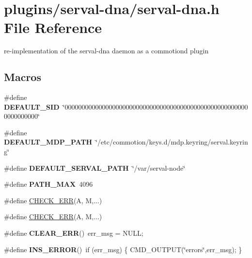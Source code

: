 \hypertarget{serval-dna_8h}{\section{plugins/serval-\/dna/serval-\/dna.h File Reference}
\label{serval-dna_8h}
}


re-\/implementation of the serval-\/dna daemon as a commotiond plugin  


\subsection*{Macros}
\begin{DoxyCompactItemize}
\item 
\hypertarget{serval-dna_8h_ade6bc30b860b7e0c016c9d1d4de78876}{\#define {\bfseries D\+E\+F\+A\+U\+L\+T\+\_\+\+S\+I\+D}~\char`\"{}0000000000000000000000000000000000000000000000000000000000000000\char`\"{}}\label{serval-dna_8h_ade6bc30b860b7e0c016c9d1d4de78876}

\item 
\hypertarget{serval-dna_8h_aa6eb102f7cb9b4ecc447f497f59aefcc}{\#define {\bfseries D\+E\+F\+A\+U\+L\+T\+\_\+\+M\+D\+P\+\_\+\+P\+A\+T\+H}~\char`\"{}/etc/commotion/keys.\+d/mdp.\+keyring/serval.\+keyring\char`\"{}}\label{serval-dna_8h_aa6eb102f7cb9b4ecc447f497f59aefcc}

\item 
\hypertarget{serval-dna_8h_ad6d73c9630ed82f7fe50ef5a025caa52}{\#define {\bfseries D\+E\+F\+A\+U\+L\+T\+\_\+\+S\+E\+R\+V\+A\+L\+\_\+\+P\+A\+T\+H}~\char`\"{}/var/serval-\/node\char`\"{}}\label{serval-dna_8h_ad6d73c9630ed82f7fe50ef5a025caa52}

\item 
\hypertarget{serval-dna_8h_ae688d728e1acdfe5988c7db45d6f0166}{\#define {\bfseries P\+A\+T\+H\+\_\+\+M\+A\+X}~4096}\label{serval-dna_8h_ae688d728e1acdfe5988c7db45d6f0166}

\item 
\#define \hyperlink{serval-dna_8h_a10ab198359509a611627a85d8321ac86}{C\+H\+E\+C\+K\+\_\+\+E\+R\+R}(A, M,...)
\item 
\#define \hyperlink{serval-dna_8h_a10ab198359509a611627a85d8321ac86}{C\+H\+E\+C\+K\+\_\+\+E\+R\+R}(A, M,...)
\item 
\hypertarget{serval-dna_8h_ad618463c254680a37e278c1e76aeb15d}{\#define {\bfseries C\+L\+E\+A\+R\+\_\+\+E\+R\+R}()~err\+\_\+msg = N\+U\+L\+L;}\label{serval-dna_8h_ad618463c254680a37e278c1e76aeb15d}

\item 
\hypertarget{serval-dna_8h_aeed42e449c7436fab8354659982dc443}{\#define {\bfseries I\+N\+S\+\_\+\+E\+R\+R\+O\+R}()~if (err\+\_\+msg) \{ C\+M\+D\+\_\+\+O\+U\+T\+P\+U\+T(\char`\"{}errors\char`\"{},err\+\_\+msg); \}}\label{serval-dna_8h_aeed42e449c7436fab8354659982dc443}

\end{DoxyCompactItemize}
